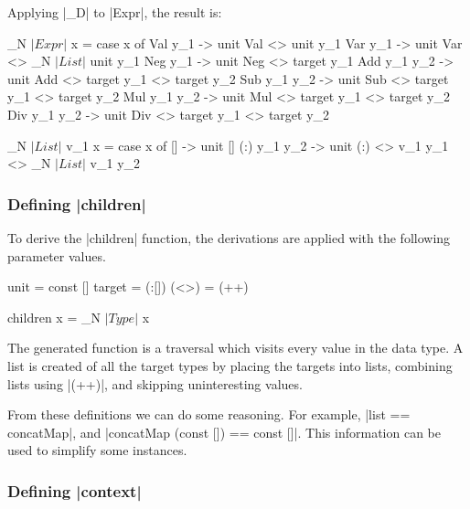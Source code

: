 Applying |_D| to |Expr|, the result is:

\begin{code}
_N $| Expr |$ \? x = case x of
    Val  y_1      -> unit Val  <> unit y_1
    Var  y_1      -> unit Var  <> _N $| List |$ \? unit y_1
    Neg  y_1      -> unit Neg  <> target y_1
    Add  y_1 y_2  -> unit Add  <> target y_1 <> target y_2
    Sub  y_1 y_2  -> unit Sub  <> target y_1 <> target y_2
    Mul  y_1 y_2  -> unit Mul  <> target y_1 <> target y_2
    Div  y_1 y_2  -> unit Div  <> target y_1 <> target y_2

_N $| List |$ \? v_1 x = case x of
    []            -> unit []
    (:)  y_1 y_2  -> unit (:) <> v_1 y_1 <> _N $| List |$ \? v_1 y_2
\end{code}

\begin{comment}
To generate a particular operation we can replace the |unit|, |target| and |<>| functions with versions specific to that operation. We do this replacement using multiple copies of the template, introducing |where| clauses with local definitions of the three functions.
\end{comment}

\subsubsection{Defining |children|}

To derive the |children| function, the derivations are applied with the following parameter values.

\begin{code}
unit    = const []
target  = (:[])
(<>)    = (++)

children x = _N $| Type |$ \? x
\end{code}

The generated function is a traversal which visits every value in the data type. A list is created of all the target types by placing the targets into lists, combining lists using |(++)|, and skipping uninteresting values.

From these definitions we can do some reasoning. For example, |list == concatMap|, and |concatMap (const []) == const []|. This information can be used to simplify some instances.

\subsubsection{Defining |context|}

